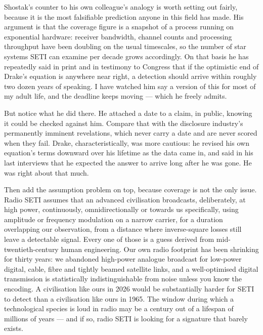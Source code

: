 Shostak's counter to his own colleague's analogy is worth setting out fairly, because it is the most
falsifiable prediction anyone in this field has made. His argument is that the coverage figure is a
snapshot of a process running on exponential hardware: receiver bandwidth, channel counts and
processing throughput have been doubling on the usual timescales, so the number of star systems SETI can
examine per decade grows accordingly. On that basis he has repeatedly said in print and in testimony to
Congress that if the optimistic end of Drake's equation is anywhere near right, a detection should
arrive within roughly two dozen years of speaking. I have watched him say a version of this for most of
my adult life, and the deadline keeps moving --- which he freely admits.

But notice what he did there. He attached a date to a claim, in public, knowing it could be checked
against him.  Compare that with the disclosure
industry's permanently imminent revelations, which never carry a date and are never scored when they
fail. Drake, characteristically, was more cautious: he revised his own equation's terms downward over his
lifetime as the data came in, and said in his last interviews that he expected the answer to arrive long
after he was gone. He was right about that much.

Then add the assumption problem on top, because coverage is not the only issue. Radio SETI assumes
that an advanced civilisation broadcasts, deliberately, at high power, continuously, omnidirectionally
or towards us specifically, using amplitude or frequency modulation on a narrow carrier, for a duration
overlapping our observation, from a distance where inverse-square losses still leave a detectable
signal. Every one of those is a guess derived from mid-twentieth-century human engineering. Our own
radio footprint has been shrinking for thirty years: we abandoned high-power analogue broadcast for
low-power digital, cable, fibre and tightly beamed satellite links, and a well-optimised digital
transmission is statistically indistinguishable from noise unless you know the encoding. A
civilisation like ours in 2026 would be substantially harder for SETI to detect than a civilisation
like ours in 1965. The window during which a technological species is loud in radio may be a century
out of a lifespan of millions of years --- and if so, radio SETI is looking for a signature that
barely exists.

